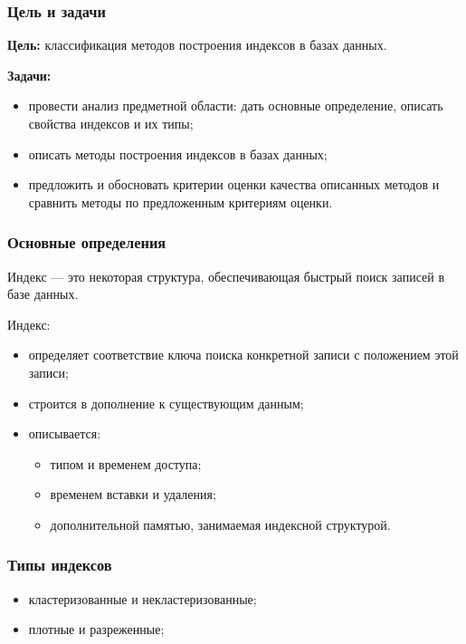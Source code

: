 \documentclass{bmstu-pr}
\begin{document}

\begin{frame}
    \frametitle{Цель и задачи}

    \textbf{Цель:} классификация методов построения индексов в
    базах данных.

    \textbf{Задачи:}
    \begin{itemize}
        \item провести анализ предметной области: дать основные определение, описать
            свойства индексов и их типы;
        \item описать методы построения индексов в базах данных;
        \item предложить и обосновать критерии оценки качества описанных методов
          и сравнить методы по предложенным критериям оценки.
    \end{itemize}
\end{frame}

\begin{frame}
    \frametitle{Основные определения}

    Индекс --- это некоторая структура, обеспечивающая быстрый поиск записей в
    базе данных.

    Индекс:

    \begin{itemize}
        \item определяет соответствие ключа поиска конкретной записи с
            положением этой записи;
        \item строится в дополнение к существующим данным;
        \item описывается:
            \begin{itemize}
                \item типом и временем доступа;
                \item временем вставки и удаления;
                \item дополнительной памятью, занимаемая индексной структурой.
            \end{itemize}
    \end{itemize}
\end{frame}

\begin{frame}
    \frametitle{Типы индексов}

    \begin{itemize}
        \item кластеризованные и некластеризованные;
        \item плотные и разреженные;
    \end{itemize}

    \hspace*{\fill}%
    \hfill
    \hspace*{\fill}

\end{frame}
\end{document}
